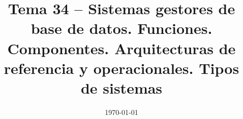 \documentclass[12pt]{report}
\title{\textbf{Tema 34 – Sistemas gestores de base de datos. Funciones. Componentes. Arquitecturas de referencia y operacionales. Tipos de sistemas }}
\author{}
\date{\today}
\begin{document}
\maketitle
\tableofcontents
\bigskip










\end{document}
